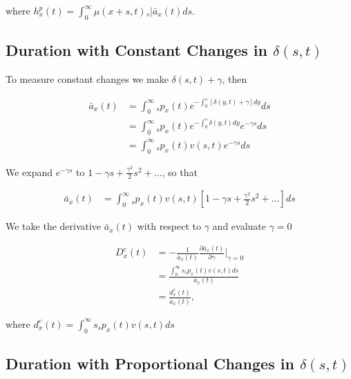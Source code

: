 \documentclass[12pt]{article}
\begin{document}
{where ${h}^{p}_{x}(t)=\int_0^\infty \mu(x+s,t)   {}_s|\bar{a}_x(t) ds$.



\subsection{Duration with Constant Changes in $\delta(s,t)$}\label{sec:DurConst}

To measure constant changes we make $\delta(s,t)+\gamma$, then

\begin{equation}\label{eq:DurationConst1}
\begin{split}
\bar{a}_{x}(t) &= \int_0^\infty {}_sp_x(t) e^{- \int_{0}^{s} [\delta(y,t)+\gamma]dy}ds \\
&= \int_0^\infty {}_sp_x(t) e^{- \int_{0}^{s}\delta(y,t)dy}e^{-\gamma s}ds \\
&= \int_0^\infty {}_sp_x(t) {v}(s,t)e^{-\gamma s}ds
\end{split}
\end{equation}

We expand $e^{-\gamma s}$ to $1-\gamma s+\frac{\gamma^2}{2} s^{2} +...$, so that


\begin{equation}\label{eq:DurationConst1}
\begin{split}
\bar{a}_{x}(t) &= \int_0^\infty {}_sp_x(t) {v}(s,t)[1-\gamma s+\frac{\gamma^2}{2} s^{2} +...]ds
\end{split}
\end{equation}

We take the derivative $\bar{a}_{x}(t)$ with respect to $\gamma$ and evaluate $\gamma=0$


\begin{equation}\label{eq:DurationConst2}
\begin{split}
{D}^{c}_x(t)&=-\frac{1}{\bar{a}_x(t)}\frac{\partial \bar{a}_x(t)}{\partial \gamma} \bigg\rvert_{\gamma=0}\\
              &= \frac{\int_0^\infty s {}_sp_x(t) {v}(s,t)ds}{\bar{a}_x(t)} \\
              &= \frac{{d}^{c}_x(t)}{\bar{a}_x(t)},
\end{split}
\end{equation}

where ${d}^{c}_x(t)=\int_0^\infty s {}_sp_x(t) {v}(s,t)ds$



\subsection{Duration with Proportional Changes in $\delta(s,t)$} \label{sec:DurProp}

}
\end{document}
